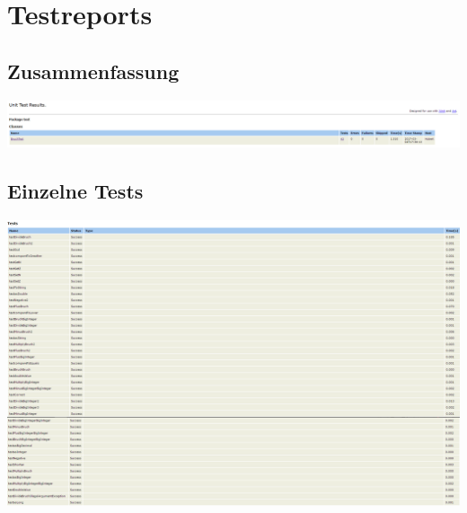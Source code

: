 
\section{Testreports}
\subsection{Zusammenfassung}
\begin{minipage}{\linewidth}
	\centering
	\includegraphics[width=1\linewidth]{images/pic1}
\end{minipage}

\subsection{Einzelne Tests}
\begin{minipage}{\linewidth}
	\centering
	\includegraphics[width=1\linewidth]{images/pic4}
\end{minipage}

